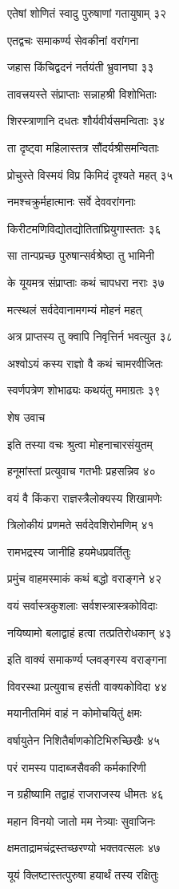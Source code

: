 एतेषां शोणितं स्वादु पुरुषाणां गतायुषाम् ३२

एतद्वचः समाकर्ण्य सेवकीनां वरांगना

जहास किंचिद्वदनं नर्तयंती भ्रुवानघा ३३

तावत्त्रयस्ते संप्राप्ताः सन्नाहश्री विशोभिताः

शिरस्त्राणानि दधतः शौर्यवीर्यसमन्विताः ३४

ता दृष्ट्वा महिलास्तत्र सौंदर्यश्रीसमन्विताः

प्रोचुस्ते विस्मयं विप्र किमिदं दृश्यते महत् ३५

नमश्चक्रुर्महात्मानः सर्वे देववरांगनाः

किरीटमणिविद्योतद्योतितांघ्रियुगास्ततः ३६

सा तान्पप्रच्छ पुरुषान्सर्वश्रेष्ठा तु भामिनी

के यूयमत्र संप्राप्ताः कथं चापधरा नराः ३७

मत्स्थलं सर्वदेवानामगम्यं मोहनं महत्

अत्र प्राप्तस्य तु क्वापि निवृत्तिर्न भवत्युत ३८

अश्वोऽयं कस्य राज्ञो वै कथं चामरवीजितः

स्वर्णपत्रेण शोभाढ्यः कथयंतु ममाग्रतः ३९

शेष उवाच

इति तस्या वचः श्रुत्वा मोहनाचारसंयुतम्

हनूमांस्तां प्रत्युवाच गतभीः प्रहसन्निव ४०

वयं वै किंकरा राज्ञस्त्रैलोक्यस्य शिखामणेः

त्रिलोकीयं प्रणमते सर्वदेवशिरोमणिम् ४१

रामभद्रस्य जानीहि हयमेधप्रवर्तितुः

प्रमुंच वाहमस्माकं कथं बद्धो वराङ्गने ४२

वयं सर्वास्त्रकुशलाः सर्वशस्त्रास्त्रकोविदाः

नयिष्यामो बलाद्वाहं हत्वा तत्प्रतिरोधकान् ४३

इति वाक्यं समाकर्ण्य प्लवङ्गस्य वराङ्गना

विवरस्था प्रत्युवाच हसंती वाक्यकोविदा ४४

मयानीतमिमं वाहं न कोमोचयितुं क्षमः

वर्षायुतेन निशितैर्बाणकोटिभिरुच्छिखैः ४५

परं रामस्य पादाब्जसैवकी कर्मकारिणी

न ग्रहीष्यामि तद्वाहं राजराजस्य धीमतः ४६

महान विनयो जातो मम नेत्र्याः सुवाजिनः

क्षमताद्रामचंद्रस्तच्छरण्यो भक्तवत्सलः ४७

यूयं क्लिष्टास्तत्पुरुषा हयार्थं तस्य रक्षितुः

